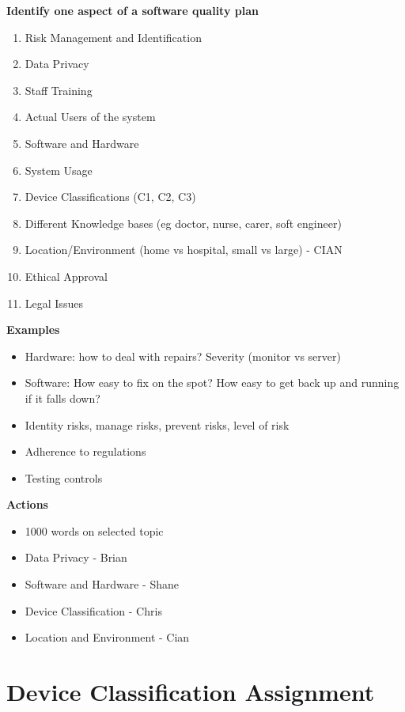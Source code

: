 \textbf{Identify one aspect of a software quality plan}
\begin{enumerate}
\item Risk Management and Identification
\item Data Privacy 
\item Staff Training
\item Actual Users of the system
\item Software and Hardware
\item System Usage
\item Device Classifications (C1, C2, C3)
\item Different Knowledge bases (eg doctor, nurse, carer, soft engineer)
\item Location/Environment (home vs hospital, small vs large) - CIAN
\item Ethical Approval
\item Legal Issues
\end{enumerate}

\textbf{Examples}
\begin{itemize}
\item Hardware: how to deal with repairs? Severity (monitor vs server)
\item Software: How easy to fix on the spot? How easy to get back up and running if it falls down?
\item Identity risks, manage risks, prevent risks, level of risk
\item Adherence to regulations
\item Testing controls
\end{itemize}

\textbf{Actions}
\begin{itemize}
\item 1000 words on selected topic
\item Data Privacy - Brian
\item Software and Hardware - Shane
\item Device Classification - Chris
\item Location and Environment - Cian
\end{itemize}

\section{Device Classification Assignment}
\label{sec:medicald}

